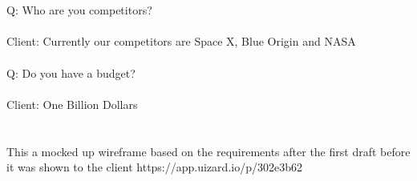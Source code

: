 \documentclass{article}
\begin{document}
\\
\\
Q: Who are you competitors?
\\
\\
Client: Currently our competitors are Space X, Blue Origin and NASA
\\
\\
Q: Do you have a budget?
\\
\\
Client: One Billion Dollars
\\
\\
\\
This a mocked up wireframe based on the requirements after the first draft before it was shown to the client https://app.uizard.io/p/302e3b62
\end{document}

